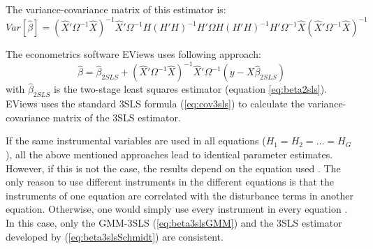 The variance-covariance matrix of this estimator is:
\begin{equation}
   Var \left[ \widehat{\beta} \right] = 
   \left( \widehat{X}' \Omega^{-1}  \widehat{X} \right)^{-1} 
   \widehat{X}' \Omega^{-1} H \left( H' H \right)^{-1} H' \Omega 
   H \left( H' H \right)^{-1} H' \Omega^{-1} \widehat{X}
   \left( \widehat{X}' \Omega^{-1}  \widehat{X} \right)^{-1}
\end{equation}


The econometrics software EViews uses following approach:
\begin{equation}
   \widehat{\beta} = \widehat{\beta}_{2SLS} + 
   \left( \widehat{X}' \Omega^{-1} \widehat{X} \right)^{-1} 
   \widehat{X}' \Omega^{-1} \left( y - X \widehat{\beta}_{2SLS} \right)
\end{equation}
with $\widehat{\beta}_{2SLS}$ is the two-stage least squares estimator
(equation \ref{eq:beta2sls}).
EViews uses the standard 3SLS formula (\ref{eq:cov3sls}) to
calculate the variance-covariance matrix of the 3SLS estimator.


If the same instrumental variables are used in all equations 
($H_1 = H_2 = \ldots = H_G$), 
all the above mentioned approaches lead to identical parameter estimates.
However, if this is not the case, the results depend on the 
equation used \citep{schmidt90}. 
The only reason to use different instruments in the different equations 
is that the instruments of one equation are correlated with the
disturbance terms in another equation. Otherwise, one would simply use
every instrument in every equation \citep{schmidt90}. 
In this case, only the GMM-3SLS (\ref{eq:beta3slsGMM})
and the 3SLS estimator developed by \cite{schmidt90} 
(\ref{eq:beta3slsSchmidt}) are consistent.


